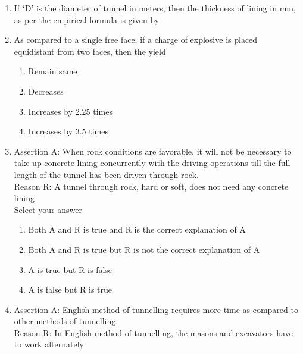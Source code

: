 \documentclass[11pt,a4paper]{article}
\begin{document}
\begin{enumerate}
{ (iii) Requires heavy timbers}
\begin{enumerate}[label=\Alph*.]
\item{Only (i) is correct}
\item{(i) and (iii) are correct}
\item{(ii) and (iii) are correct}
\item{(i) and (ii) are correct}
\end{enumerate}
\item{If `D' is the diameter of tunnel in meters, then the thickness of lining in mm, as per the empirical formula is given by
}
\\
\item{As compared to a single free face, if a charge of explosive is placed equidistant from two faces, then the yield}
\begin{enumerate}[label=\Alph*.]
\item{Remain same}
\item{Decreases}
\item{Increases by 2.25 times}
\item{Increases by 3.5 times}
\end{enumerate}
\item{Assertion A: When rock conditions are favorable, it will not be necessary to take up concrete lining concurrently with the driving operations till the full length of the tunnel has been driven through rock. \\
Reason R: A tunnel through rock, hard or soft, does not need any concrete lining \\
Select your answer}
\begin{enumerate}[label=\Alph*.]
\item{Both A and R is true and R is the correct explanation of A}
\item{Both A and R is true but R is not the correct explanation of A}
\item{A is true but R is false}
\item{A is false but R is true}
\end{enumerate}
\item{Assertion A: English method of tunnelling requires more time as compared to other methods of tunnelling. \\
Reason R: In English method of tunnelling, the masons and excavators have to work alternately \\

}
\end{enumerate}
\end{document}
